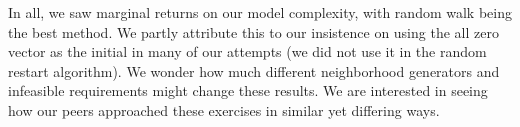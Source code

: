 \documentclass[11pt]{article}
\begin{document}
In all, we saw marginal returns on our model complexity, with random walk being the best method.  We partly attribute this to our insistence on using the all zero vector as the initial in many of our attempts (we did not use it in the random restart algorithm).  We wonder how much different neighborhood generators and infeasible requirements might change these results.  We are interested in seeing how our peers approached these exercises in similar yet differing ways.
\end{document}
